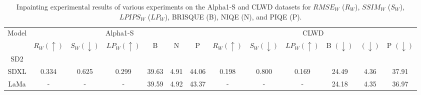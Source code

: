 
\begin{table*}[t]
\caption{Inpainting experimental results of various experiments on the Alpha1-S and CLWD datasets for $RMSE_W$ ($R_W$), $SSIM_W$ ($S_W$), $LPIPS_W$ ($LP_W$), BRISQUE (B), NIQE (N), and PIQE (P).  }
\label{tab:alpha_expr}
\vskip 0.15in
\begin{center}
\begin{small}
\begin{sc}
\begin{tabular}{c|cccccc|cccccc}
\toprule
 \multirow{2}{*}{Model} &  \multicolumn{6}{c|}{Alpha1-S} & \multicolumn{6}{c}{CLWD} \\ 
  & $R_W (\uparrow)$ & $S_W (\downarrow)$ & $LP_W (\uparrow)$ & B & N & P & $R_W (\uparrow)$ & $S_W (\downarrow)$ & $LP_W (\uparrow)$ & B $(\downarrow)$ & $(\downarrow)$ & P  $(\downarrow)$\\
 \midrule
 SD2 &  \\
 SDXL & 0.334 & 0.625 & 0.299 & 39.63 & 4.91 & 44.06 & 0.198 & 0.800 & 0.169 & 24.49 & 4.36 & 37.91 \\
 LaMa & - & -& - & 39.59 & 4.92 & 43.37 & - & - & - & 24.18 & 4.35 & 36.97 \\
 
\bottomrule
\end{tabular}
\end{sc}
\end{small}
\end{center}
\vskip -0.1in
\end{table*} 

